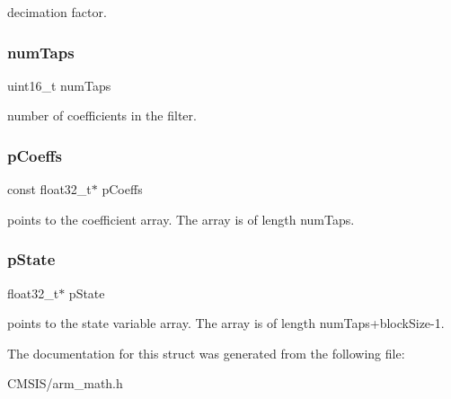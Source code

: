 decimation factor. \mbox{\label{structarm__fir__decimate__instance__f32_a751941891e47f522a7f5375fe8990aac}} 
\subsubsection{\texorpdfstring{numTaps}{numTaps}}
{\footnotesize\ttfamily uint16\+\_\+t num\+Taps}

number of coefficients in the filter. \mbox{\label{structarm__fir__decimate__instance__f32_a39230f04a29d8321948e339633780442}} 
\subsubsection{\texorpdfstring{pCoeffs}{pCoeffs}}
{\footnotesize\ttfamily const float32\+\_\+t$\ast$ p\+Coeffs}

points to the coefficient array. The array is of length num\+Taps. \mbox{\label{structarm__fir__decimate__instance__f32_a335c87e6fdc4b96601d95a5de8b9c463}} 
\subsubsection{\texorpdfstring{pState}{pState}}
{\footnotesize\ttfamily float32\+\_\+t$\ast$ p\+State}

points to the state variable array. The array is of length num\+Taps+block\+Size-\/1. 

The documentation for this struct was generated from the following file\+:\begin{DoxyCompactItemize}
\item 
C\+M\+S\+I\+S/arm\+\_\+math.\+h\end{DoxyCompactItemize}
